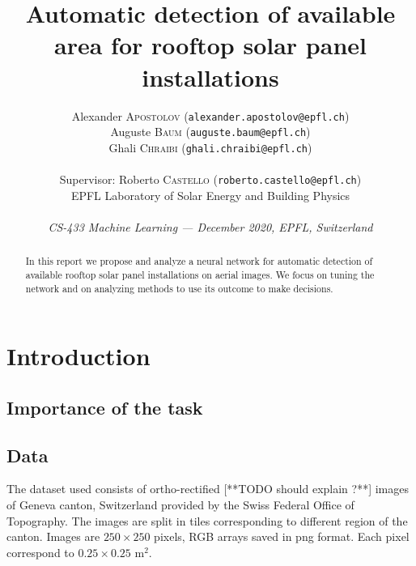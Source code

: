 \documentclass[10pt,conference]{IEEEtran}
\begin{document}
\title{{\LARGE Automatic detection of available area for rooftop solar panel installations}\vspace{-3mm}}    

\author{
  Alexander \textsc{Apostolov} (\texttt{alexander.apostolov@epfl.ch})\\
  Auguste \textsc{Baum} (\texttt{auguste.baum@epfl.ch})\\
  Ghali \textsc{Chraibi} (\texttt{ghali.chraibi@epfl.ch})\\
  \\
  Supervisor: Roberto \textsc{Castello} (\texttt{roberto.castello@epfl.ch})\\ EPFL Laboratory of Solar Energy and Building Physics\\
  \\
  \textit{CS-433 Machine Learning --- December 2020, EPFL, Switzerland}
}
\maketitle

\begin{abstract}
  In this report we propose and analyze a neural network for automatic detection of available rooftop solar panel installations on aerial images. We focus on tuning the network and on analyzing methods to use its outcome to make decisions. 
\end{abstract}

\section{Introduction}
\subsection{Importance of the task}

\subsection{Data}
The dataset used consists of ortho-rectified [**TODO should explain ?**] images of Geneva canton, Switzerland provided by the Swiss Federal Office of Topography. The images are split in tiles corresponding to different region of the canton. Images are $250 \times 250$ pixels, RGB arrays saved in png format. Each pixel correspond to $0.25 \times 0.25 \text{ m}^2$.
\end{document}
